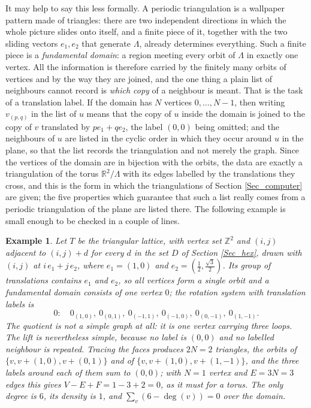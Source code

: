 \documentclass[10pt,a4paper]{article}
\newtheorem{example}[theorem]{Example}
\begin{document}
It may help to say this less formally. A periodic triangulation is a wallpaper pattern made of
triangles: there are two independent directions in which the whole picture slides onto itself, and a
finite piece of it, together with the two sliding vectors $e_{1},e_{2}$ that generate $\Lambda $,
already determines everything. Such a finite piece is a \emph{fundamental domain}: a region meeting
every orbit of $\Lambda $ in exactly one vertex. All the information is therefore carried by the
finitely many orbits of vertices and by the way they are joined, and the one thing a plain list of
neighbours cannot record is \emph{which copy} of a neighbour is meant. That is the task of a
translation label. If the domain has $N$ vertices $0,\ldots ,N-1$, then writing $v_{(p,q)}$ in the
list of $u$ means that the copy of $u$ inside the domain is joined to the copy of $v$ translated by
$pe_{1}+qe_{2}$, the label $(0,0)$ being omitted; and the neighbours of $u$ are listed in the cyclic
order in which they occur around $u$ in the plane, so that the list records the triangulation and not
merely the graph. Since the vertices of the domain are in bijection with the orbits, the data are
exactly a triangulation of the torus $\mathbb{R}^{2}/\Lambda $ with its edges labelled by the
translations they cross, and this is the form in which the triangulations of Section
\ref{Sec_computer} are given; the five properties which guarantee that such a list really comes from
a periodic triangulation of the plane are listed there. The following example is small enough to be
checked in a couple of lines.

\begin{example}
\label{Ex_trilattice}Let $T$ be the triangular lattice, with vertex set $\mathbb{Z}^{2}$ and $(i,j)$
adjacent to $(i,j)+d$ for every $d$ in the set $D$ of Section \ref{Sec_hex}, drawn with $(i,j)$ at
$i\,e_{1}+j\,e_{2}$, where $e_{1}=(1,0)$ and $e_{2}=(\tfrac{1}{2},\tfrac{\sqrt{3}}{2})$. Its group of
translations contains $e_{1}$ and $e_{2}$, so all vertices form a single orbit and a fundamental
domain consists of one vertex $0$; the rotation system with translation labels is
\[
0:\quad 0_{(1,0)},\ 0_{(0,1)},\ 0_{(-1,1)},\ 0_{(-1,0)},\ 0_{(0,-1)},\ 0_{(1,-1)}.
\]
The quotient is not a simple graph at all: it is one vertex carrying three loops. The lift is
nevertheless simple, because no label is $(0,0)$ and no labelled neighbour is repeated. Tracing the
faces produces $2N=2$ triangles, the orbits of $\{v,v+(1,0),v+(0,1)\}$ and of
$\{v,v+(1,0),v+(1,-1)\}$, and the three labels around each of them sum to $(0,0)$; with $N=1$ vertex
and $E=3N=3$ edges this gives $V-E+F=1-3+2=0$, as it must for a torus. The only degree is $6$, its
density is $1$, and $\sum_{v}(6-\deg (v))=0$ over the domain.
\end{example}
\end{document}
